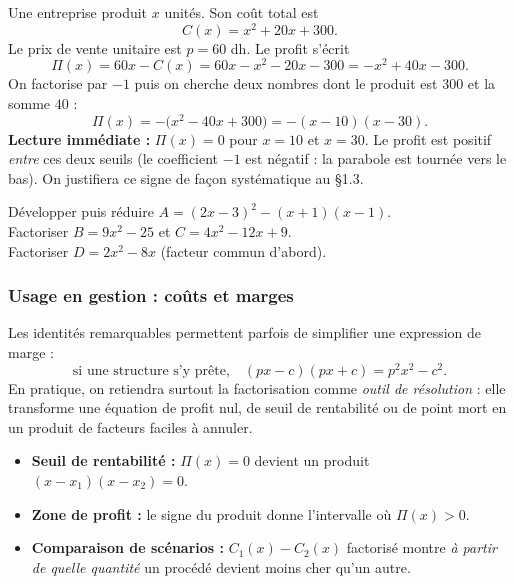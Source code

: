 \documentclass[12pt,a4paper]{article}
\begin{document}
\begin{exemplebox}
Une entreprise produit $x$ unités. Son coût total est
$$C(x) = x^2 + 20x + 300.$$
Le prix de vente unitaire est $p = 60$ dh. Le profit s'écrit
$$\Pi(x) = 60x - C(x) = 60x - x^2 - 20x - 300 = -x^2 + 40x - 300.$$
On factorise par $-1$ puis on cherche deux nombres dont le produit est $300$ et la somme $40$ :
$$\Pi(x) = -\bigl(x^2 - 40x + 300\bigr) = -(x-10)(x-30).$$
\textbf{Lecture immédiate :} $\Pi(x)=0$ pour $x=10$ et $x=30$. Le profit est positif \emph{entre} ces deux seuils (le coefficient $-1$ est négatif : la parabole est tournée vers le bas). On justifiera ce signe de façon systématique au \S1.3.
\end{exemplebox}

\begin{exobox}
Développer puis réduire $A = (2x-3)^2 - (x+1)(x-1)$.\\
Factoriser $B = 9x^2-25$ et $C = 4x^2-12x+9$.\\
Factoriser $D = 2x^2-8x$ (facteur commun d'abord).
\end{exobox}

\subsubsection{Usage en gestion : coûts et marges}

Les identités remarquables permettent parfois de simplifier une expression de marge :
$$\text{si une structure s'y prête,}\quad (px-c)(px+c) = p^2x^2 - c^2.$$
En pratique, on retiendra surtout la factorisation comme \emph{outil de résolution} : elle transforme une équation de profit nul, de seuil de rentabilité ou de point mort en un produit de facteurs faciles à annuler.

\begin{gestionbox}
\begin{itemize}[leftmargin=1.2cm]
  \item \textbf{Seuil de rentabilité :} $\Pi(x)=0$ devient un produit $(x-x_1)(x-x_2)=0$.
  \item \textbf{Zone de profit :} le signe du produit donne l'intervalle où $\Pi(x)>0$.
  \item \textbf{Comparaison de scénarios :} $C_1(x)-C_2(x)$ factorisé montre \emph{à partir de quelle quantité} un procédé devient moins cher qu'un autre.
\end{itemize}
\end{gestionbox}
\end{document}
